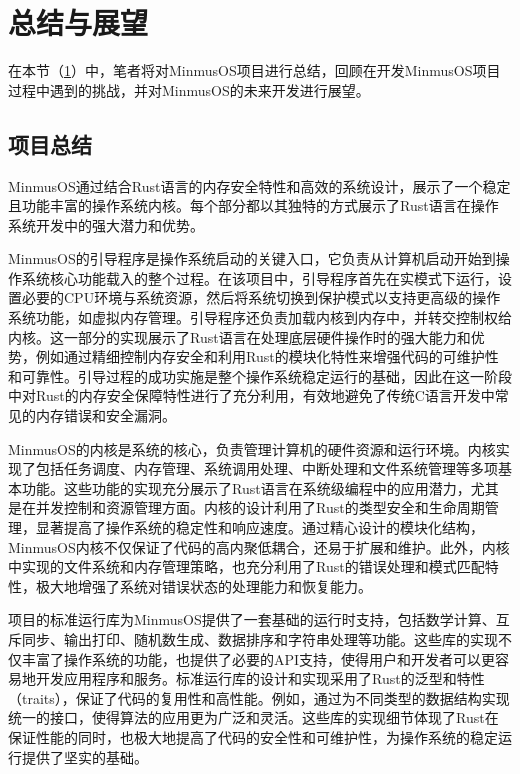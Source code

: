 \section{总结与展望}\label{sec:ConclusionAndOutlook}

在本节（\cref{sec:ConclusionAndOutlook}）中，笔者将对MinmusOS项目进行总结，回顾在开发MinmusOS项目过程中遇到的挑战，并对MinmusOS的未来开发进行展望。

\subsection{项目总结}

MinmusOS通过结合Rust语言的内存安全特性和高效的系统设计，展示了一个稳定且功能丰富的操作系统内核。每个部分都以其独特的方式展示了Rust语言在操作系统开发中的强大潜力和优势。

MinmusOS的引导程序是操作系统启动的关键入口，它负责从计算机启动开始到操作系统核心功能载入的整个过程。在该项目中，引导程序首先在实模式下运行，设置必要的CPU环境与系统资源，然后将系统切换到保护模式以支持更高级的操作系统功能，如虚拟内存管理。引导程序还负责加载内核到内存中，并转交控制权给内核。这一部分的实现展示了Rust语言在处理底层硬件操作时的强大能力和优势，例如通过精细控制内存安全和利用Rust的模块化特性来增强代码的可维护性和可靠性。引导过程的成功实施是整个操作系统稳定运行的基础，因此在这一阶段中对Rust的内存安全保障特性进行了充分利用，有效地避免了传统C语言开发中常见的内存错误和安全漏洞。

MinmusOS的内核是系统的核心，负责管理计算机的硬件资源和运行环境。内核实现了包括任务调度、内存管理、系统调用处理、中断处理和文件系统管理等多项基本功能。这些功能的实现充分展示了Rust语言在系统级编程中的应用潜力，尤其是在并发控制和资源管理方面。内核的设计利用了Rust的类型安全和生命周期管理，显著提高了操作系统的稳定性和响应速度。通过精心设计的模块化结构，MinmusOS内核不仅保证了代码的高内聚低耦合，还易于扩展和维护。此外，内核中实现的文件系统和内存管理策略，也充分利用了Rust的错误处理和模式匹配特性，极大地增强了系统对错误状态的处理能力和恢复能力。

项目的标准运行库为MinmusOS提供了一套基础的运行时支持，包括数学计算、互斥同步、输出打印、随机数生成、数据排序和字符串处理等功能。这些库的实现不仅丰富了操作系统的功能，也提供了必要的API支持，使得用户和开发者可以更容易地开发应用程序和服务。标准运行库的设计和实现采用了Rust的泛型和特性（traits），保证了代码的复用性和高性能。例如，通过为不同类型的数据结构实现统一的接口，使得算法的应用更为广泛和灵活。这些库的实现细节体现了Rust在保证性能的同时，也极大地提高了代码的安全性和可维护性，为操作系统的稳定运行提供了坚实的基础。

